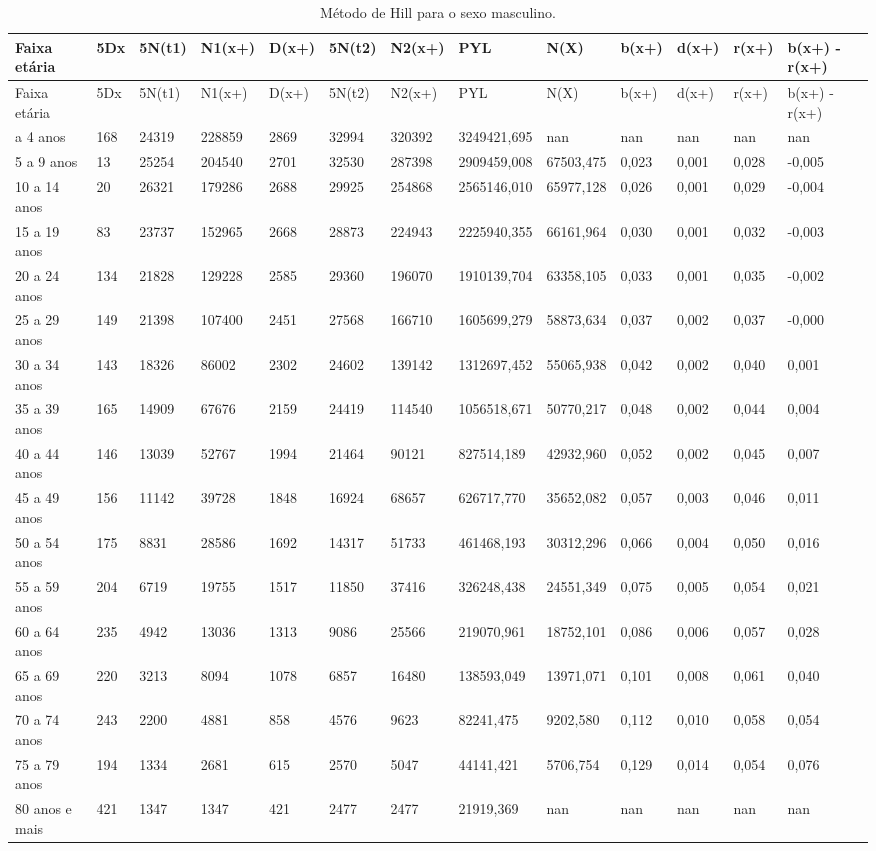 \documentclass[
  12pt,
  a4paper,
]{scrreprt}
\begin{document}
\begin{longtable}[]{@{}lllllllllllll@{}}
\caption{Método de Hill para o sexo
masculino.}\label{T_23de2}\tabularnewline
\toprule\noalign{}
Faixa etária & 5Dx & 5N(t1) & N1(x+) & D(x+) & 5N(t2) & N2(x+) & PYL &
N(X) & b(x+) & d(x+) & r(x+) & b(x+) - r(x+) \\
\midrule\noalign{}
\endfirsthead
\toprule\noalign{}
Faixa etária & 5Dx & 5N(t1) & N1(x+) & D(x+) & 5N(t2) & N2(x+) & PYL &
N(X) & b(x+) & d(x+) & r(x+) & b(x+) - r(x+) \\
\midrule\noalign{}
\endhead
\bottomrule\noalign{}
\endlastfoot
0 a 4 anos & 168 & 24319 & 228859 & 2869 & 32994 & 320392 & 3249421,695
& nan & nan & nan & nan & nan \\
5 a 9 anos & 13 & 25254 & 204540 & 2701 & 32530 & 287398 & 2909459,008 &
67503,475 & 0,023 & 0,001 & 0,028 & -0,005 \\
10 a 14 anos & 20 & 26321 & 179286 & 2688 & 29925 & 254868 & 2565146,010
& 65977,128 & 0,026 & 0,001 & 0,029 & -0,004 \\
15 a 19 anos & 83 & 23737 & 152965 & 2668 & 28873 & 224943 & 2225940,355
& 66161,964 & 0,030 & 0,001 & 0,032 & -0,003 \\
20 a 24 anos & 134 & 21828 & 129228 & 2585 & 29360 & 196070 &
1910139,704 & 63358,105 & 0,033 & 0,001 & 0,035 & -0,002 \\
25 a 29 anos & 149 & 21398 & 107400 & 2451 & 27568 & 166710 &
1605699,279 & 58873,634 & 0,037 & 0,002 & 0,037 & -0,000 \\
30 a 34 anos & 143 & 18326 & 86002 & 2302 & 24602 & 139142 & 1312697,452
& 55065,938 & 0,042 & 0,002 & 0,040 & 0,001 \\
35 a 39 anos & 165 & 14909 & 67676 & 2159 & 24419 & 114540 & 1056518,671
& 50770,217 & 0,048 & 0,002 & 0,044 & 0,004 \\
40 a 44 anos & 146 & 13039 & 52767 & 1994 & 21464 & 90121 & 827514,189 &
42932,960 & 0,052 & 0,002 & 0,045 & 0,007 \\
45 a 49 anos & 156 & 11142 & 39728 & 1848 & 16924 & 68657 & 626717,770 &
35652,082 & 0,057 & 0,003 & 0,046 & 0,011 \\
50 a 54 anos & 175 & 8831 & 28586 & 1692 & 14317 & 51733 & 461468,193 &
30312,296 & 0,066 & 0,004 & 0,050 & 0,016 \\
55 a 59 anos & 204 & 6719 & 19755 & 1517 & 11850 & 37416 & 326248,438 &
24551,349 & 0,075 & 0,005 & 0,054 & 0,021 \\
60 a 64 anos & 235 & 4942 & 13036 & 1313 & 9086 & 25566 & 219070,961 &
18752,101 & 0,086 & 0,006 & 0,057 & 0,028 \\
65 a 69 anos & 220 & 3213 & 8094 & 1078 & 6857 & 16480 & 138593,049 &
13971,071 & 0,101 & 0,008 & 0,061 & 0,040 \\
70 a 74 anos & 243 & 2200 & 4881 & 858 & 4576 & 9623 & 82241,475 &
9202,580 & 0,112 & 0,010 & 0,058 & 0,054 \\
75 a 79 anos & 194 & 1334 & 2681 & 615 & 2570 & 5047 & 44141,421 &
5706,754 & 0,129 & 0,014 & 0,054 & 0,076 \\
80 anos e mais & 421 & 1347 & 1347 & 421 & 2477 & 2477 & 21919,369 & nan
& nan & nan & nan & nan \\
\end{longtable}
\end{document}
